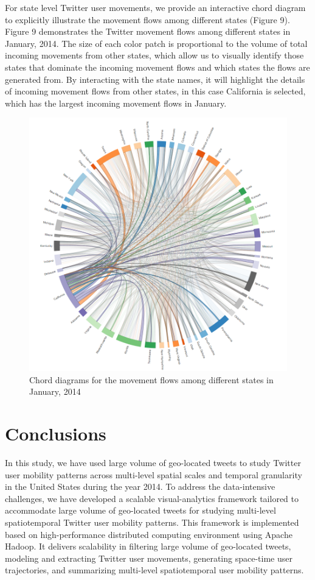 \documentclass[ijgi,article,submit,moreauthors,pdftex,10pt,a4paper]{mdpi}
\theoremstyle{mdpi}
\newcounter{ex}
\newcounter{re}
\theoremstyle{mdpidefinition}
\begin{document}
For state level Twitter user movements, we provide an interactive chord diagram to explicitly illustrate the movement flows among different states (Figure 9). Figure 9 demonstrates the Twitter movement flows among different states in January, 2014. The size of each color patch is proportional to the volume of total incoming movements from other states, which allow us to visually identify those states that dominate the incoming movement flows and which states the flows are generated from.
By interacting with the state names, it will highlight the details of incoming movement flows from other states, in this case California is selected, which has the largest incoming movement flows in January.\newline

\begin{figure}[h]
\centering
\includegraphics[width=1.0\linewidth]{./figures/vaca_flow}
\caption{Chord diagrams for the movement flows among different states in January, 2014}
\label{fig:vaca_movement}
\end{figure}
\FloatBarrier


\section{Conclusions}
In this study, we have used large volume of geo-located tweets to study Twitter user mobility patterns across multi-level spatial scales and temporal granularity in the United States during the year 2014. 
To address the data-intensive challenges, we have developed a scalable visual-analytics framework tailored to accommodate large volume of geo-located tweets for studying multi-level spatiotemporal Twitter user mobility patterns.
This framework is implemented based on high-performance distributed computing environment using Apache Hadoop.
It delivers scalability in filtering large volume of geo-located tweets, modeling and extracting Twitter user movements, generating space-time user trajectories, and summarizing multi-level spatiotemporal user mobility patterns.
\end{document}
